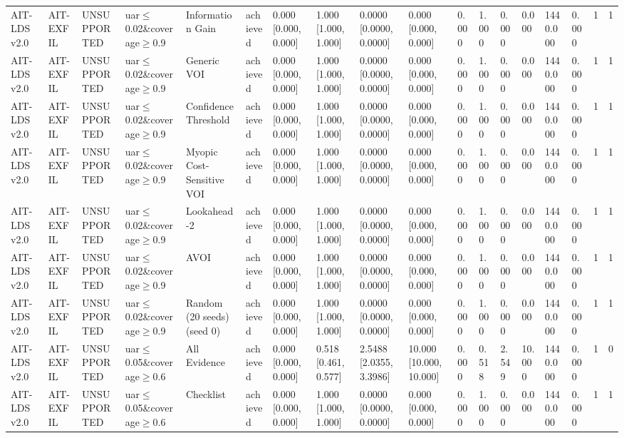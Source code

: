 \begin{table}[!ht]
{\begin{tabular}{llllllllllllllllll}
AIT-LDS v2.0 & AIT-EXFIL & UNSUPPORTED & uar$\le$0.02\&coverage$\ge$0.9 & Information Gain & achieved & 0.000 [0.000, 0.000] & 1.000 [1.000, 1.000] & 0.0000 [0.0000, 0.0000] & 0.000 [0.000, 0.000] & 0.000 & 1.000 & 0.000 & 0.000 & 1440.000 & 0.000 & 1 & 1 \\
AIT-LDS v2.0 & AIT-EXFIL & UNSUPPORTED & uar$\le$0.02\&coverage$\ge$0.9 & Generic VOI & achieved & 0.000 [0.000, 0.000] & 1.000 [1.000, 1.000] & 0.0000 [0.0000, 0.0000] & 0.000 [0.000, 0.000] & 0.000 & 1.000 & 0.000 & 0.000 & 1440.000 & 0.000 & 1 & 1 \\
AIT-LDS v2.0 & AIT-EXFIL & UNSUPPORTED & uar$\le$0.02\&coverage$\ge$0.9 & Confidence Threshold & achieved & 0.000 [0.000, 0.000] & 1.000 [1.000, 1.000] & 0.0000 [0.0000, 0.0000] & 0.000 [0.000, 0.000] & 0.000 & 1.000 & 0.000 & 0.000 & 1440.000 & 0.000 & 1 & 1 \\
AIT-LDS v2.0 & AIT-EXFIL & UNSUPPORTED & uar$\le$0.02\&coverage$\ge$0.9 & Myopic Cost-Sensitive VOI & achieved & 0.000 [0.000, 0.000] & 1.000 [1.000, 1.000] & 0.0000 [0.0000, 0.0000] & 0.000 [0.000, 0.000] & 0.000 & 1.000 & 0.000 & 0.000 & 1440.000 & 0.000 & 1 & 1 \\
AIT-LDS v2.0 & AIT-EXFIL & UNSUPPORTED & uar$\le$0.02\&coverage$\ge$0.9 & Lookahead-2 & achieved & 0.000 [0.000, 0.000] & 1.000 [1.000, 1.000] & 0.0000 [0.0000, 0.0000] & 0.000 [0.000, 0.000] & 0.000 & 1.000 & 0.000 & 0.000 & 1440.000 & 0.000 & 1 & 1 \\
AIT-LDS v2.0 & AIT-EXFIL & UNSUPPORTED & uar$\le$0.02\&coverage$\ge$0.9 & AVOI & achieved & 0.000 [0.000, 0.000] & 1.000 [1.000, 1.000] & 0.0000 [0.0000, 0.0000] & 0.000 [0.000, 0.000] & 0.000 & 1.000 & 0.000 & 0.000 & 1440.000 & 0.000 & 1 & 1 \\
AIT-LDS v2.0 & AIT-EXFIL & UNSUPPORTED & uar$\le$0.02\&coverage$\ge$0.9 & Random (20 seeds) (seed 0) & achieved & 0.000 [0.000, 0.000] & 1.000 [1.000, 1.000] & 0.0000 [0.0000, 0.0000] & 0.000 [0.000, 0.000] & 0.000 & 1.000 & 0.000 & 0.000 & 1440.000 & 0.000 & 1 & 1 \\
AIT-LDS v2.0 & AIT-EXFIL & UNSUPPORTED & uar$\le$0.05\&coverage$\ge$0.6 & All Evidence & achieved & 0.000 [0.000, 0.000] & 0.518 [0.461, 0.577] & 2.5488 [2.0355, 3.3986] & 10.000 [10.000, 10.000] & 0.000 & 0.518 & 2.549 & 10.000 & 1440.000 & 0.000 & 1 & 0 \\
AIT-LDS v2.0 & AIT-EXFIL & UNSUPPORTED & uar$\le$0.05\&coverage$\ge$0.6 & Checklist & achieved & 0.000 [0.000, 0.000] & 1.000 [1.000, 1.000] & 0.0000 [0.0000, 0.0000] & 0.000 [0.000, 0.000] & 0.000 & 1.000 & 0.000 & 0.000 & 1440.000 & 0.000 & 1 & 1 \\

\end{tabular}}
\end{table}

